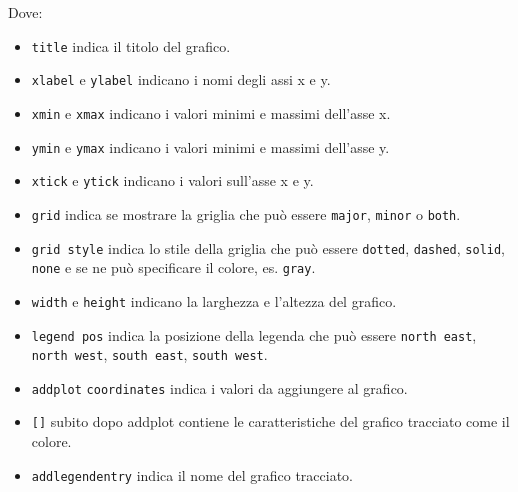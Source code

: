 Dove:
\begin{itemize}
    \item \lstinline+title+ indica il titolo del grafico. 
    
    \item \lstinline+xlabel+ e \lstinline+ylabel+ indicano i nomi degli assi x e y. 
    
    \item \lstinline+xmin+ e \lstinline+xmax+ indicano i valori minimi e massimi dell'asse x. 

    \item \lstinline+ymin+ e \lstinline+ymax+ indicano i valori minimi e massimi dell'asse y.
    
    \item \lstinline+xtick+ e \lstinline+ytick+ indicano i valori sull'asse x e y.
    
    \item \lstinline+grid+ indica se mostrare la griglia che può essere \texttt{major}, \texttt{minor} o \texttt{both}.
    
    \item \lstinline+grid style+ indica lo stile della griglia che può essere \texttt{dotted}, \texttt{dashed}, \texttt{solid}, \texttt{none} e se ne può specificare il colore, es. \texttt{gray}.
     
    \item \lstinline+width+ e \lstinline+height+ indicano la larghezza e l'altezza del grafico.
     
    \item \lstinline+legend pos+ indica la posizione della legenda che può essere \texttt{north east}, \texttt{north west}, \texttt{south east}, \texttt{south west}.
    
    \item \lstinline+addplot+ \lstinline+coordinates+ indica i valori da aggiungere al grafico.
    
    \item \lstinline+[]+ subito dopo addplot contiene le caratteristiche del grafico tracciato come il colore.
    
    \item \lstinline+addlegendentry+ indica il nome del grafico tracciato.
\end{itemize}



